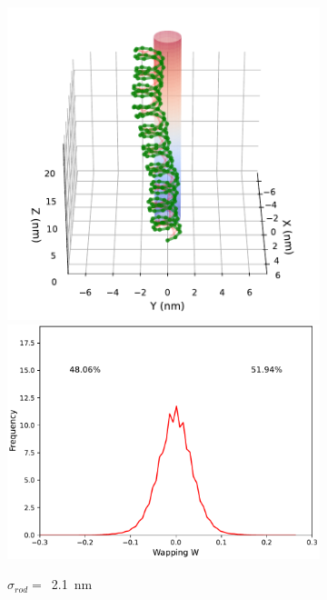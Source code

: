 \documentclass[a4paper,10pt]{article}
\begin{document}
\begin{figure}[tb]
\centering
\begin{subfigure}{.3\textwidth}
\includegraphics[width=\textwidth]{r1_A_2000000.pdf}
\includegraphics[width=\textwidth]{r1_A_wr_pr.pdf}
\caption{$\sigma_{rod}=$~\SI{2.1}{\nm}}
\label{fig:r1_a}
\end{subfigure}
\begin{subfigure}{.3\textwidth}

\end{subfigure}
\end{figure}
\end{document}
